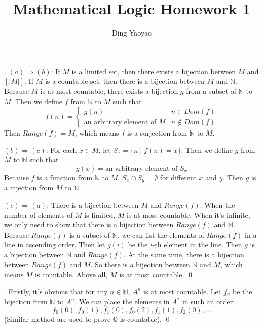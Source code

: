 \documentclass[10pt,a4paper]{article}
\author{Ding Yaoyao}
\title{Mathematical Logic Homework 1}
\newenvironment{sol}[1]
{\par\vspace{3mm}\noindent{\it Solution #1}.}
{\qed}
\newcommand{\abs}[1]{\lvert#1\rvert}
\begin{document}
	\maketitle
	
	\begin{sol}{2.1}
		$(a)\Rightarrow(b)$: If $M$ is a limited set, then there exists a bijection between $M$ and $[\abs{M}]$. If $M$ is a countable set, then there is a bijection between $M$ and $\mathbb{N}$. Because $M$ is at most countable, there exists a bijection $g$ from a subset of $\mathbb{N}$ to $M$. Then we define $f$ from $\mathbb{N}$ to $M$ such that
		\begin{equation}
		f(n) = 
		\begin{cases}
			g(n) & n \in Dom(f) \\
			\text{an arbitrary element of $M$} & n \not \in Dom(f) 
		\end{cases}
		\end{equation}
		Then $Range(f) = M$, which means $f$ is a surjection from $\mathbb{N}$ to $M$.
		
		$(b)\Rightarrow(c)$: For each $x \in M$, let $S_x = \{n \mid f(n) = x\}$. Then we define $g$ from $M$ to $\mathbb{N}$ such that
		\begin{equation}
		g(x) = \text{an arbitrary element of $S_x$}
		\end{equation}
		Because $f$ is a function from $\mathbb{N}$ to $M$, $S_x \cap S_y = \emptyset$ for different $x$ and $y$. Then $g$ is a injection from $M$ to $\mathbb{N}$.
		
		$(c)\Rightarrow(a)$: There is a bijection between $M$ and $Range(f)$. When the number of elements of $M$ is limited, $M$ is at most countable. When it's infinite, we only need to show that there is a bijection between $Range(f)$ and $\mathbb{N}$. Because $Range(f)$ is a subset of $\mathbb{N}$, we can list the elements of $Range(f)$ in a line in ascending order. Then let $g(i)$ be the $i$-th element in the line. Then $g$ is a bijection between $\mathbb{N}$ and $Range(f)$. At the same time, there is a bijection between $Range(f)$ and $M$. So there is a bijection between $\mathbb{N}$ and $M$, which means $M$ is countable. Above all, $M$ is at most countable.
	\end{sol}

	\begin{sol}{2.2}
		Firstly, it's obvious that for any $n \in \mathbb{N}$, $A^n$ is at most countable. Let $f_n$ be the bijection from $\mathbb{N}$ to $A^n$. We can place the elements in $A^*$ in such an order:
		$$
			f_0(0), f_0(1), f_1(0), f_0(2), f_1(1), f_2(0), \dots 
		$$
		(Similar method are used to prove $\mathbb{Q}$ is countable).
	\end{sol}
\end{document}
